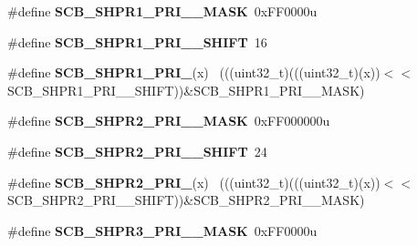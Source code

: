 \begin{DoxyCompactItemize}
\item 
\hypertarget{group___s_c_b___register___masks_gadfdffea384a30b01c4fbb098a77532b6}{}\#define {\bfseries S\+C\+B\+\_\+\+S\+H\+P\+R1\+\_\+\+P\+R\+I\+\_\+\_\+\+M\+A\+S\+K}~0x\+F\+F0000u\label{group___s_c_b___register___masks_gadfdffea384a30b01c4fbb098a77532b6}

\item 
\hypertarget{group___s_c_b___register___masks_gac39687ecdce013f219034bf544d48bf8}{}\#define {\bfseries S\+C\+B\+\_\+\+S\+H\+P\+R1\+\_\+\+P\+R\+I\+\_\+\_\+\+S\+H\+I\+F\+T}~16\label{group___s_c_b___register___masks_gac39687ecdce013f219034bf544d48bf8}

\item 
\hypertarget{group___s_c_b___register___masks_gaf117bca49fd273596094ec3bde093bb2}{}\#define {\bfseries S\+C\+B\+\_\+\+S\+H\+P\+R1\+\_\+\+P\+R\+I\+\_}(x)                                          ~(((uint32\+\_\+t)(((uint32\+\_\+t)(x))$<$$<$S\+C\+B\+\_\+\+S\+H\+P\+R1\+\_\+\+P\+R\+I\+\_\+\_\+\+S\+H\+I\+F\+T))\&S\+C\+B\+\_\+\+S\+H\+P\+R1\+\_\+\+P\+R\+I\+\_\+\_\+\+M\+A\+S\+K)\label{group___s_c_b___register___masks_gaf117bca49fd273596094ec3bde093bb2}

\item 
\hypertarget{group___s_c_b___register___masks_ga3d791e5cf57bac7bf773150ba1f0683e}{}\#define {\bfseries S\+C\+B\+\_\+\+S\+H\+P\+R2\+\_\+\+P\+R\+I\+\_\+\_\+\+M\+A\+S\+K}~0x\+F\+F000000u\label{group___s_c_b___register___masks_ga3d791e5cf57bac7bf773150ba1f0683e}

\item 
\hypertarget{group___s_c_b___register___masks_ga4ccb3e607c07307c5ee1c749ff8da4ca}{}\#define {\bfseries S\+C\+B\+\_\+\+S\+H\+P\+R2\+\_\+\+P\+R\+I\+\_\+\_\+\+S\+H\+I\+F\+T}~24\label{group___s_c_b___register___masks_ga4ccb3e607c07307c5ee1c749ff8da4ca}

\item 
\hypertarget{group___s_c_b___register___masks_gafb1a543618040a0c1cde2d050554e99b}{}\#define {\bfseries S\+C\+B\+\_\+\+S\+H\+P\+R2\+\_\+\+P\+R\+I\+\_}(x)                                        ~(((uint32\+\_\+t)(((uint32\+\_\+t)(x))$<$$<$S\+C\+B\+\_\+\+S\+H\+P\+R2\+\_\+\+P\+R\+I\+\_\+\_\+\+S\+H\+I\+F\+T))\&S\+C\+B\+\_\+\+S\+H\+P\+R2\+\_\+\+P\+R\+I\+\_\+\_\+\+M\+A\+S\+K)\label{group___s_c_b___register___masks_gafb1a543618040a0c1cde2d050554e99b}

\item 
\hypertarget{group___s_c_b___register___masks_ga9f73cd19baa16589b1ea9b2049617e97}{}\#define {\bfseries S\+C\+B\+\_\+\+S\+H\+P\+R3\+\_\+\+P\+R\+I\+\_\+\_\+\+M\+A\+S\+K}~0x\+F\+F0000u\label{group___s_c_b___register___masks_ga9f73cd19baa16589b1ea9b2049617e97}


\end{DoxyCompactItemize}
